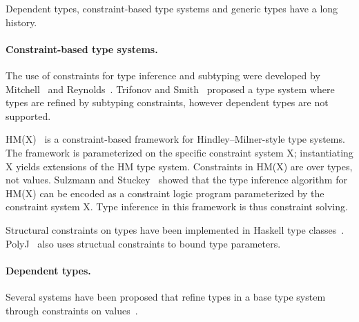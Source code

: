 
Dependent types, constraint-based type systems and generic types have a long
history.

\paragraph{Constraint-based type systems.}

The use of constraints for type inference and subtyping were
developed by
Mitchell~\cite{mitchell84}
and
Reynolds~\cite{reynolds85}.
%
Trifonov and Smith~\cite{trifonov96}
proposed a type system where types are refined by subtyping
constraints, however dependent types are not supported.


HM(X)~\cite{sulzmann97type,pottier01a,pottier-remy-attapl}
is a constraint-based framework
for Hindley--Milner-style type systems.
The framework is parameterized on the specific constraint system
X; instantiating X yields extensions of the HM type system.
Constraints in HM(X) are over types, not values.
%
Sulzmann and Stuckey~\cite{sulzmann-hmx-clpx} showed that the
type inference algorithm for HM(X) can be encoded as a
constraint logic program parameterized by the constraint system
X.  Type inference in this framework is thus constraint solving.

Structural constraints on types have been implemented in 
Haskell type classes~\cite{haskell-type-classes}.
PolyJ~\cite{polyj} also uses structual constraints to bound type
parameters.

\paragraph{Dependent types.}

Several systems have been proposed that refine types in a base
type system through constraints on
values~\cite{refinement-types,conditional-types,jones94,sized-types,flanagan-popl06,flanagan-fool06,liquid-types}.


